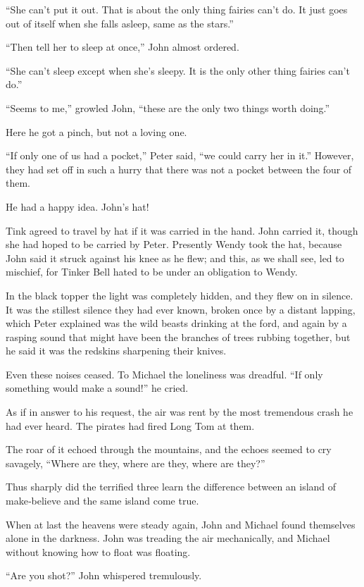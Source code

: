 “She can’t put it out.
That is about the only thing fairies can’t do.
It just goes out of itself when she falls asleep, same as the stars.”

“Then tell her to sleep at once,” John almost ordered.

“She can’t sleep except when she’s sleepy.
It is the only other thing fairies can’t do.”

“Seems to me,” growled John, “these are the only two things worth doing.”

Here he got a pinch, but not a loving one.

“If only one of us had a pocket,” Peter said, “we could carry her in it.”
However, they had set off in such a hurry that there was not a pocket between the four of them.

He had a happy idea.
John’s hat!

Tink agreed to travel by hat if it was carried in the hand.
John carried it, though she had hoped to be carried by Peter.
Presently Wendy took the hat, because John said it struck against his knee as he flew;
and this, as we shall see, led to mischief,
for Tinker Bell hated to be under an obligation to Wendy.

In the black topper the light was completely hidden, and they flew on in silence.
It was the stillest silence they had ever known, broken once by a distant lapping,
which Peter explained was the wild beasts drinking at the ford,
and again by a rasping sound that might have been the branches of trees rubbing together,
but he said it was the redskins sharpening their knives.

Even these noises ceased.
To Michael the loneliness was dreadful.
“If only something would make a sound!\@” he cried.

As if in answer to his request, the air was rent by the most tremendous crash he had ever heard.
The pirates had fired Long Tom at them.

The roar of it echoed through the mountains,
and the echoes seemed to cry savagely, “Where are they, where are they, where are they?”

Thus sharply did the terrified three learn the difference
between an island of make‐believe and the same island come true.

When at last the heavens were steady again,
John and Michael found themselves alone in the darkness.
John was treading the air mechanically, and Michael without knowing how to float was floating.

“Are you shot?\@” John whispered tremulously.

